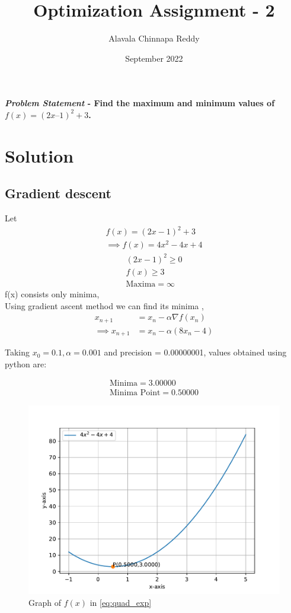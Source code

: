 \documentclass[journal,10pt,twocolumn]{article}
\title{\textbf{Optimization Assignment - 2}}
\author{Alavala Chinnapa Reddy}
\date{September 2022}
\providecommand{\brak}[1]{\ensuremath{\left(#1\right)}}
\begin{document}
\maketitle
\paragraph{\textit{Problem Statement} - Find the maximum and minimum values of $f (x) = (2x – 1)^2+ 3$. }
\section*{\large Solution}
\subsection*{\normalsize Gradient descent}
Let 
\begin{align}
	f(x) = (2x-1)^2+3\\
	\implies f(x) = 4x^2-4x+4
	\label{eq:quad_exp}
\end{align}
\begin{eqnarray}
(2x-1)^2\geq0\\
f(x)\geq3\\
	\boxed{\text{Maxima}=\infty}
\end{eqnarray}
f(x)  consists only minima,\\

Using gradient ascent method we can find its minima ,
    \begin{align}
        x_{n+1} &= x_n - \alpha \nabla f(x_n) \\
        \implies x_{n+1} &= x_n - \alpha \brak{8x_n-4}
    \end{align}
    
Taking $x_0=0.1,\alpha=0.001$ and precision = 0.00000001, values obtained using python are:
    
    \begin{align}
        \boxed{\text{Minima} = 3.00000}\\
        \boxed{\text{Minima Point} = 0.50000}
    \end{align}

\begin{figure}[t]
	\centering
	\includegraphics[width=1\columnwidth]{figs/2.pdf}
	\caption{Graph of $f(x)$ in \eqref{eq:quad_exp}}
	\label{fig:graph_fx}
\end{figure}
\end{document}
